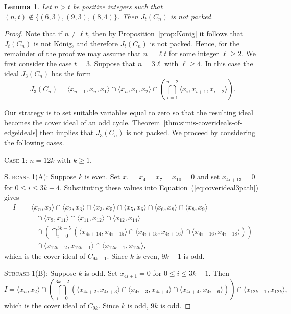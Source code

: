 \documentclass[12pt]{amsart}
\newtheorem{lemma}[proposition]{Lemma}
\begin{document}
\begin{lemma}\label{lem:cycle-not-packed}
    Let $n>t$ be positive integers such that $(n,t) \notin \{(6,3),(9,3), (8,4)\}$. Then $J_t(C_n)$ is not packed.    
\end{lemma}
\begin{proof}
     Note that if $n \neq \ell t$, then by Proposition~\ref{prop:Konig} it follows that $J_t(C_n)$ is not K\"onig, and therefore $J_t(C_n)$ is not packed. Hence, for the remainder of the proof we may assume that $n=\ell t$ for some integer $\ell \geq 2$. We first consider the case $t=3$. Suppose that $n=3\ell$ with $\ell \geq 4$. In this case the ideal $J_3(C_n)$ has the form
\begin{equation}\label{eq:coverideal3path}
J_3(C_n)
= \langle x_{n-1},x_n,x_1 \rangle \cap \langle x_n,x_1,x_2 \rangle
\cap \left( \bigcap_{i=1}^{n-2} \langle x_i,x_{i+1},x_{i+2} \rangle \right).
\end{equation}

Our strategy is to set suitable variables equal to zero so that the resulting ideal becomes the cover ideal of an odd cycle. Theorem~\ref{thm:simis-coverideals-of-edgeideals} then implies that $J_3(C_n)$ is not packed. We proceed by considering the following cases.

\noindent
\textsc{Case 1}: $n=12k$ with $k\ge1$.

\noindent
\textsc{Subcase 1(A):} Suppose $k$ is even.
Set $x_1=x_4=x_7=x_{10}=0$ and set $x_{4i+13}=0$ for $0\le i\le 3k-4$.
Substituting these values into Equation~(\ref{eq:coverideal3path}) gives
\[
\begin{aligned}
I
&= \langle x_n,x_2 \rangle \cap \langle x_2,x_3 \rangle \cap \langle x_3,x_5 \rangle \cap \langle x_5,x_6 \rangle
   \cap \langle x_6,x_8 \rangle \cap \langle x_8,x_9 \rangle \\
&\qquad \cap \langle x_9,x_{11} \rangle \cap \langle x_{11},x_{12} \rangle \cap  \langle x_{12},x_{14} \rangle \\
&\qquad \cap
\left( \bigcap_{i=0}^{3k-5}
\left(\langle x_{4i+14},x_{4i+15} \rangle \cap \langle x_{4i+15},x_{4i+16} \rangle \cap \langle x_{4i+16},x_{4i+18} \rangle \right)\right) \\
&\qquad \cap \langle x_{12k-2},x_{12k-1} \rangle \cap \langle x_{12k-1},x_{12k}\rangle,
\end{aligned}
\]
which is the cover ideal of $C_{9k-1}$. Since $k$ is even, $9k-1$ is odd.

\noindent
\medskip
\textsc{Subcase 1(B):} Suppose $k$ is odd.
Set $x_{4i+1}=0$ for $0\le i\le 3k-1$. Then
\[
I
= \langle x_n,x_2 \rangle
\cap \left(\bigcap_{i=0}^{3k-2}
\left(\langle x_{4i+2},x_{4i+3} \rangle \cap \langle x_{4i+3},x_{4i+4} \rangle \cap \langle x_{4i+4},x_{4i+6} \rangle \right)\right)
\cap \langle x_{12k-1},x_{12k} \rangle,
\]
which is the cover ideal of $C_{9k}$. Since $k$ is odd, $9k$ is odd.


\end{proof}
\end{document}
